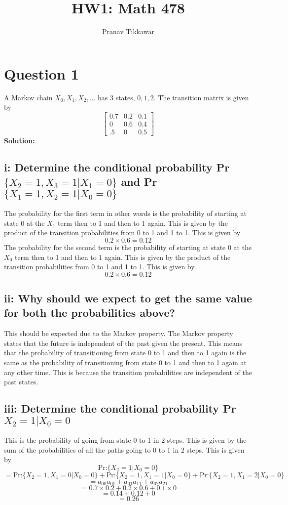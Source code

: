 \documentclass{article}
\author{Pranav Tikkawar}
\title{HW1: Math 478}
\begin{document}
\maketitle
\section*{Question 1}
A Markov chain $X_0, X_1, X_2, \ldots$ has 3 states, $0, 1, 2$. The transition matrix is given by
$$ \begin{bmatrix}
    0.7 & 0.2 & 0.1\\
    0 & 0.6 & 0.4\\
    .5 & 0 & 0.5
\end{bmatrix}$$
\textbf{Solution:}\\
\subsection*{i: Determine the conditional probability Pr$\{ X_2 =1, X_3 = 1 | X_1 = 0\}$ and Pr$\{X_1 = 1, X_2 = 1 | X_0 = 0\}$}
The probability for the first term in other words is the probability of starting at state 0 at the $X_1$ term then to 1 and then to 1 again. This is given by the product of the transition probabilities from 0 to 1 and 1 to 1. This is given by
$$0.2 \times 0.6 = 0.12$$
The probability for the second term is the probability of starting at state 0 at the $X_0$ term then to 1 and then to 1 again. This is given by the product of the transition probabilities from 0 to 1 and 1 to 1. This is given by
$$0.2 \times 0.6 = 0.12$$
\subsection*{ii: Why should we expect to get the same value for both the probabilities above?}
This should be expected due to the Markov property. The Markov property states that the future is independent of the past given the present. This means that the probability of transitioning from state 0 to 1 and then to 1 again is the same as the probability of transitioning from state 0 to 1 and then to 1 again at any other time. This is because the transition probabilities are independent of the past states.

\subsection*{iii:  Determine the conditional probability Pr${X_2 = 1 | X_0 = 0}$}
This is the probability of going from state 0 to 1 in 2 steps. This is given by the sum of the probabilities of all the paths going to 0 to 1 in 2 steps. This is given by 
$$ \text{Pr:} \{X_2 = 1 | X_0 = 0\} $$
$$ = \text{Pr:} \{X_2 = 1, X_1 = 0 | X_0 = 0\} + \text{Pr:} \{X_2 = 1, X_1 = 1 | X_0 = 0\} + \text{Pr:} \{X_2 = 1, X_1 = 2 | X_0 = 0\}$$
$$ = a_{00}a_{01} + a_{01}a_{11} + a_{02}a_{21}$$
$$ = 0.7 \times 0.2 + 0.2 \times 0.6 + 0.1 \times 0$$
$$ = 0.14 + 0.12 + 0$$
$$ = 0.26$$
\end{document}
